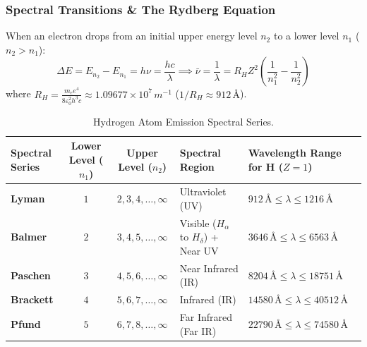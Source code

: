 \documentclass[10pt,a4paper]{article}
\begin{document}
\subsubsection{Spectral Transitions \& The Rydberg Equation}
When an electron drops from an initial upper energy level $n_2$ to a lower level $n_1$ ($n_2 > n_1$):
\begin{equation}
  \Delta E = E_{n_2} - E_{n_1} = h\nu = \frac{h c}{\lambda} \implies \bar{\nu} = \frac{1}{\lambda} = R_H Z^2 \left(\frac{1}{n_1^2} - \frac{1}{n_2^2}\right)
\end{equation}
where $R_H = \frac{m_e e^4}{8\varepsilon_0^2 h^3 c} \approx 1.09677 \times 10^7\,\si{m^{-1}}$ ($1/R_H \approx 912\,\text{\AA}$).

\begin{table}[htbp]
\centering
\small
\renewcommand{\arraystretch}{1.2}
\begin{tabularx}{\textwidth}{p{2.8cm} c c p{4.5cm} Y}
\toprule
\textbf{Spectral Series} & \textbf{Lower Level ($n_1$)} & \textbf{Upper Level ($n_2$)} & \textbf{Spectral Region} & \textbf{Wavelength Range for H ($Z=1$)} \\
\midrule
\textbf{Lyman} & $1$ & $2, 3, 4, \dots, \infty$ & Ultraviolet (UV) & $912\,\text{\AA} \le \lambda \le 1216\,\text{\AA}$ \\
\textbf{Balmer} & $2$ & $3, 4, 5, \dots, \infty$ & Visible ($H_\alpha$ to $H_\delta$) + Near UV & $3646\,\text{\AA} \le \lambda \le 6563\,\text{\AA}$ \\
\textbf{Paschen} & $3$ & $4, 5, 6, \dots, \infty$ & Near Infrared (IR) & $8204\,\text{\AA} \le \lambda \le 18751\,\text{\AA}$ \\
\textbf{Brackett} & $4$ & $5, 6, 7, \dots, \infty$ & Infrared (IR) & $14580\,\text{\AA} \le \lambda \le 40512\,\text{\AA}$ \\
\textbf{Pfund} & $5$ & $6, 7, 8, \dots, \infty$ & Far Infrared (Far IR) & $22790\,\text{\AA} \le \lambda \le 74580\,\text{\AA}$ \\
\bottomrule
\end{tabularx}
\caption{Hydrogen Atom Emission Spectral Series.}
\end{table}
\end{document}
